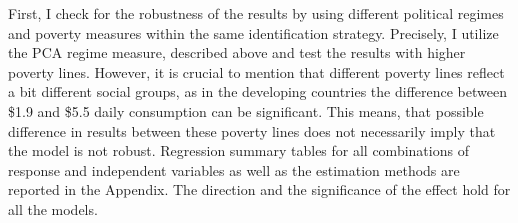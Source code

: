 \documentclass[a4paper, 12pt]{article}
\begin{document}
    First, I check for the robustness of the results by using different political regimes and poverty measures within the same identification strategy. Precisely, I utilize the PCA regime measure, described above and test the results with higher poverty lines. However, it is crucial to mention that different poverty lines reflect a bit different social groups, as in the developing countries the difference between \$1.9 and \$5.5 daily consumption can be significant. This means, that possible difference in results between these poverty lines does not necessarily imply that the model is not robust. Regression summary tables for all combinations of response and independent variables as well as the estimation methods are reported in the Appendix. The direction and the significance of the effect hold for all the models.
    \\
    
\end{document}
